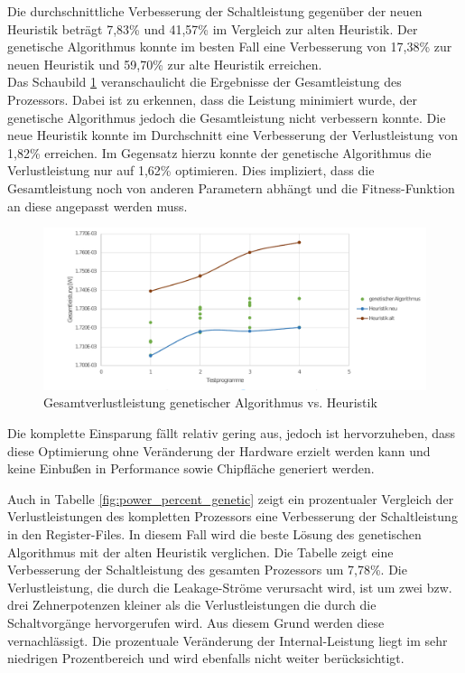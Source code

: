 Die durchschnittliche Verbesserung der Schaltleistung gegenüber der neuen Heuristik beträgt 7,83\% und 41,57\% im Vergleich zur alten Heuristik. Der genetische Algorithmus konnte im besten Fall eine Verbesserung von 17,38\% zur neuen Heuristik und 59,70\% zur alte Heuristik erreichen.\\
Das Schaubild \ref{fig:eval_genetic_total_power} veranschaulicht die Ergebnisse der Gesamtleistung des Prozessors. Dabei ist zu erkennen, dass die Leistung minimiert wurde, der genetische Algorithmus jedoch die Gesamtleistung nicht verbessern konnte. Die neue Heuristik konnte im Durchschnitt eine Verbesserung der Verlustleistung von 1,82\% erreichen. Im Gegensatz hierzu konnte der genetische Algorithmus die Verlustleistung nur auf 1,62\% optimieren. Dies impliziert, dass die Gesamtleistung noch von anderen Parametern abhängt und die Fitness-Funktion an diese angepasst werden muss.

\begin{figure}[H]
	\centering
	\includegraphics[width=\textwidth]{fig/gesamtleistung_genetik_heuristik.pdf}
	\caption{Gesamtverlustleistung genetischer Algorithmus vs. Heuristik}
	\label{fig:eval_genetic_total_power}
\end{figure}

Die komplette Einsparung fällt relativ gering aus, jedoch ist hervorzuheben, dass diese Optimierung ohne Veränderung der Hardware erzielt werden kann und keine Einbußen in Performance sowie Chipfläche generiert werden.
%

Auch in Tabelle \ref{fig:power_percent_genetic} zeigt ein prozentualer Vergleich der Verlustleistungen des kompletten Prozessors eine Verbesserung der Schaltleistung in den Register-Files. In diesem Fall wird die beste Lösung des genetischen Algorithmus mit der alten Heuristik verglichen. Die Tabelle zeigt eine Verbesserung der Schaltleistung des gesamten Prozessors um 7,78\%. Die Verlustleistung, die durch die Leakage-Ströme verursacht wird, ist um zwei bzw. drei Zehnerpotenzen kleiner als die Verlustleistungen die durch die Schaltvorgänge hervorgerufen wird. Aus diesem Grund werden diese vernachlässigt. 
Die prozentuale Veränderung der Internal-Leistung liegt im sehr niedrigen Prozentbereich und wird ebenfalls nicht weiter berücksichtigt. 

